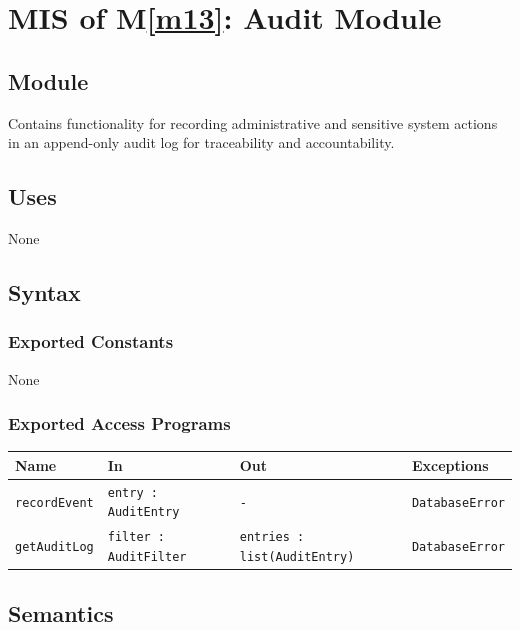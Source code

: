 \documentclass[12pt, titlepage]{article}
\begin{document}
\newpage

\section{MIS of M\ref{m13}: Audit Module}

\subsection{Module}

Contains functionality for recording administrative and sensitive system
actions in an append-only audit log for traceability and accountability.

\subsection{Uses}

None

\subsection{Syntax}

\subsubsection{Exported Constants}

None

\subsubsection{Exported Access Programs}

\begin{center}
\begin{tabularx}{\textwidth}{p{} p{} p{} p{}}
\hline
\textbf{Name} & \textbf{In} & \textbf{Out} & \textbf{Exceptions} \\
\hline
\texttt{recordEvent} &
\texttt{entry : AuditEntry} &
\texttt{-} &
\texttt{DatabaseError} \\
\hline
\texttt{getAuditLog} &
\texttt{filter : AuditFilter} &
\texttt{entries : list(AuditEntry)} &
\texttt{DatabaseError} \\
\hline

\end{tabularx}
\end{center}

\subsection{Semantics}
\end{document}
